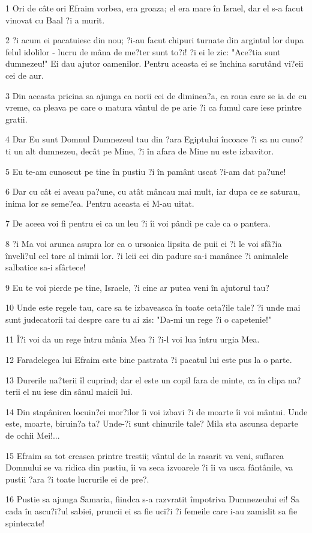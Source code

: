 \par 1 Ori de câte ori Efraim vorbea, era groaza; el era mare în Israel, dar el s-a facut vinovat cu Baal ?i a murit.
\par 2 ?i acum ei pacatuiesc din nou; ?i-au facut chipuri turnate din argintul lor dupa felul idolilor - lucru de mâna de me?ter sunt to?i! ?i ei le zic: "Ace?tia sunt dumnezeu!" Ei dau ajutor oamenilor. Pentru aceasta ei se închina sarutând vi?eii cei de aur.
\par 3 Din aceasta pricina sa ajunga ca norii cei de diminea?a, ca roua care se ia de cu vreme, ca pleava pe care o matura vântul de pe arie ?i ca fumul care iese printre gratii.
\par 4 Dar Eu sunt Domnul Dumnezeul tau din ?ara Egiptului încoace ?i sa nu cuno?ti un alt dumnezeu, decât pe Mine, ?i în afara de Mine nu este izbavitor.
\par 5 Eu te-am cunoscut pe tine în pustiu ?i în pamânt uscat ?i-am dat pa?une!
\par 6 Dar cu cât ei aveau pa?une, cu atât mâncau mai mult, iar dupa ce se saturau, inima lor se seme?ea. Pentru aceasta ei M-au uitat.
\par 7 De aceea voi fi pentru ei ca un leu ?i îi voi pândi pe cale ca o pantera.
\par 8 ?i Ma voi arunca asupra lor ca o ursoaica lipsita de puii ei ?i le voi sfâ?ia înveli?ul cel tare al inimii lor. ?i leii cei din padure sa-i manânce ?i animalele salbatice sa-i sfârtece!
\par 9 Eu te voi pierde pe tine, Israele, ?i cine ar putea veni în ajutorul tau?
\par 10 Unde este regele tau, care sa te izbaveasca în toate ceta?ile tale? ?i unde mai sunt judecatorii tai despre care tu ai zis: "Da-mi un rege ?i o capetenie!"
\par 11 Î?i voi da un rege întru mânia Mea ?i ?i-l voi lua întru urgia Mea.
\par 12 Faradelegea lui Efraim este bine pastrata ?i pacatul lui este pus la o parte.
\par 13 Durerile na?terii îl cuprind; dar el este un copil fara de minte, ca în clipa na?terii el nu iese din sânul maicii lui.
\par 14 Din stapânirea locuin?ei mor?ilor îi voi izbavi ?i de moarte îi voi mântui. Unde este, moarte, biruin?a ta? Unde-?i sunt chinurile tale? Mila sta ascunsa departe de ochii Mei!...
\par 15 Efraim sa tot creasca printre trestii; vântul de la rasarit va veni, suflarea Domnului se va ridica din pustiu, îi va seca izvoarele ?i îi va usca fântânile, va pustii ?ara ?i toate lucrurile ei de pre?.
\par 16 Pustie sa ajunga Samaria, fiindca s-a razvratit împotriva Dumnezeului ei! Sa cada în ascu?i?ul sabiei, pruncii ei sa fie uci?i ?i femeile care i-au zamislit sa fie spintecate!

